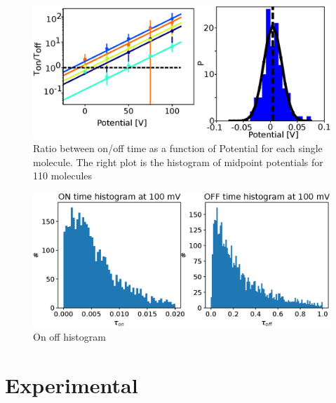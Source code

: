 \documentclass[journal=jpclcd,manuscript=article]{achemso}
\begin{document}
\begin{figure}
	\includegraphics[width=\textwidth]{Figure/Figure_2_midpoint.eps}
	\caption{Ratio between on/off time as a function of Potential 		for each single molecule. The right plot is the histogram of  	 	midpoint potentials for 110 molecules}
	\label{fig:midpoint}
\end{figure}
\begin{figure}
	\includegraphics[width=\textwidth]{Figure/Figure_3_on_off_1D.eps}
	\caption{On off histogram}
	\label{fig:midpoint}
\end{figure}

\section{Experimental}

\end{document}
